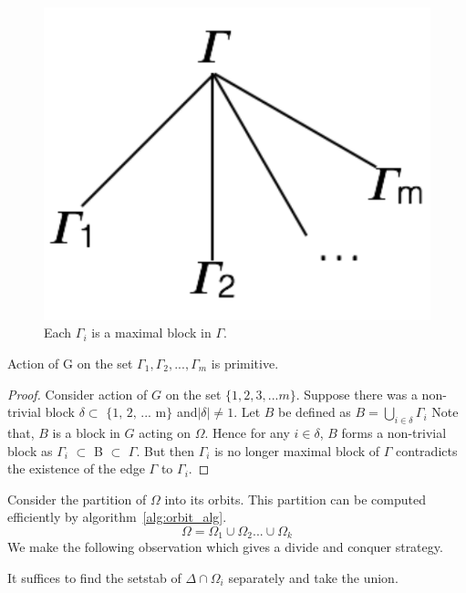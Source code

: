 \begin{figure}[htp!]
	\centering
	\includegraphics[scale=0.5]{images/structuretree.pdf}
	\caption{Each $\Gamma_{i}$ is a maximal block in $\Gamma$.}
	\label{fig:maxblocks}
\end{figure}

\begin{claim}
Action of G on the set ${\Gamma_{1}, \Gamma_{2}, ..., \Gamma_{m}}$ is primitive.
\end{claim}
\begin{proof}
Consider action of $G$ on the set $\{1, 2, 3, ... m\}$. Suppose there was a non-trivial block $\delta \subset \text{ \{1, 2, ... m\}}$ and$|\delta| 
\neq 1 $. Let $B$ be defined as $ B = \bigcup_{i \in \delta} \Gamma_{i} $
Note that, $B$ is a block in $G$ acting on $\Omega$. 
Hence for any $i \in \delta$, $B$ forms a non-trivial block as $\Gamma_{i}$ $\subset$ B $\subset$
 $\Gamma$. But then $\Gamma_i$ is no longer maximal block of $\Gamma$  contradicts the existence of the edge $\Gamma$ to  $\Gamma_{i}$.
\end{proof}

Consider the partition of $\Omega$ into its orbits. This partition can be computed efficiently by algorithm~\ref{alg:orbit_alg}. 
$$ \Omega = \Omega_{1} \cup \Omega_{2} ... \cup \Omega_{k} $$
We make the following observation which gives a divide and conquer strategy.
\begin{observation}
It suffices to find the setstab of $\Delta\cap\Omega_{i}$ separately and take the union.
\end{observation}

